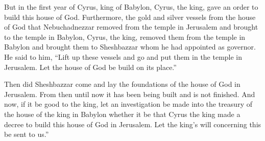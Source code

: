 \begin{inparaenum}
   But in the first year of Cyrus, king of Babylon, Cyrus, the king, gave an order to build this house of God.%
   Furthermore, the gold and silver vessels from the house of God that Nebuchadnezzar removed from the temple in Jerusalem and brought to the temple in Babylon, Cyrus, the king, removed them from the temple in Babylon and brought them to Sheshbazzar whom he had appointed as governor.%
   He said to him, ``Lift up these vessels and go and put them in the temple in Jerusalem. Let the house of God be build on its place.''%
  
   Then did Sheshbazzar come and lay the foundations of the house of God in Jerusalem. From then until now it has been being built and is not finished.%
   And now, if it be good to the king, let an investigation be made into the treasury of the house of the king in Babylon whether it be that Cyrus the king made a decree to build this house of God in Jerusalem. Let the king's will concerning this be sent to us.''%
\end{inparaenum}
